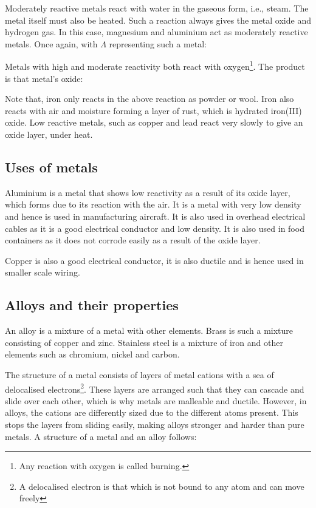 Moderately reactive metals react with water in the gaseous form, i.e., steam. The metal itself
must also be heated. 
Such a reaction always gives the metal oxide and hydrogen gas.
In this case, magnesium and aluminium act as moderately reactive metals. Once
again, with $\Lambda$ representing such a metal:
\begin{center}
\end{center}

Metals with high and moderate reactivity both react with oxygen\footnote{Any reaction with oxygen
is called burning.}. The product is that metal's oxide:
\begin{center}
\end{center}
Note that, iron only reacts in the above reaction as powder or wool. 
Iron also reacts with air and moisture forming a layer of rust, which is hydrated iron(III) oxide.
Low reactive metals, such as
copper and lead react very slowly to give an oxide layer, under heat.

\subsection{Uses of metals}
Aluminium is a metal that shows low reactivity as a result of its oxide layer, which forms due
to its reaction with the air. It is a metal with very low density and hence is used in manufacturing
aircraft. It is also used in overhead electrical cables as it is a good electrical conductor and
low density. It is also used in food containers as it does not corrode easily as a result of the
oxide layer.

Copper is also a good electrical conductor, it is also ductile and is hence used in smaller scale
wiring.

\subsection{Alloys and their properties}
An alloy is a mixture of a metal with other elements. Brass is such a mixture consisting of copper
and zinc. Stainless steel is a mixture of iron and other elements such as chromium, nickel and
carbon.

The structure of a metal consists of layers of metal cations with a sea of delocalised electrons\footnote{
A delocalised electron is that which is not bound to any atom and can move freely}. These
layers are arranged such that they can cascade and slide over each other, which is why metals are
malleable and ductile. However, in alloys, the cations are differently sized due to the different
atoms present. This stops the layers from sliding easily, making alloys stronger and harder than
pure metals. A structure of a metal and an alloy follows:

